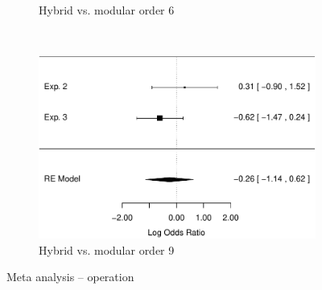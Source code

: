 \documentclass[man,mask,10pt]{apa6}
\begin{document}
\begin{figure}[t]
\begin{subfigure}[c]{0.4\textwidth}
\caption{Hybrid vs. modular order 6}
\end{subfigure}
~
\begin{subfigure}[c]{0.4\textwidth}
\centering
\includegraphics[width=\textwidth]{figures/meta/question_typeoperation_9_conditionhybrid.pdf}
\caption{Hybrid vs. modular order 9}
\end{subfigure}
\caption{Meta analysis -- operation}
\label{meta_op}
\end{figure}\noindent 
\FloatBarrier
\end{document}
